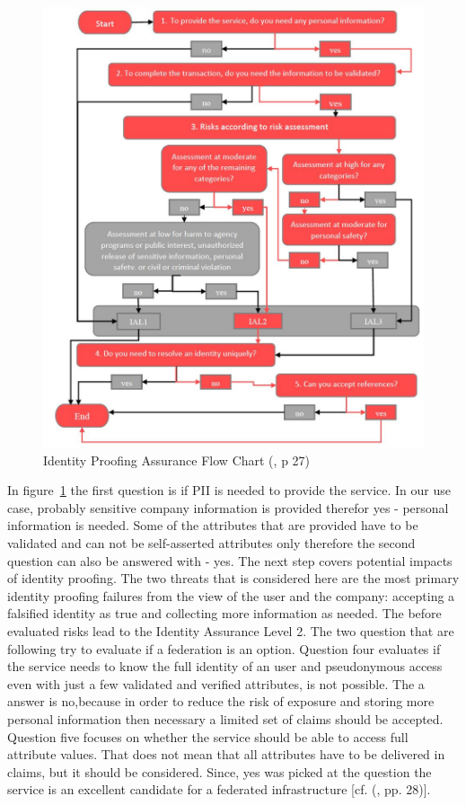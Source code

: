 \begin{figure}[h]
	\centering
	\includegraphics[width=0.9\linewidth]{images/ial_flow_red}
	\caption{Identity Proofing Assurance Flow Chart (\cite{NIST:2017:DIG}, p 27)}
	\label{fig:ialflow}
\end{figure}


In figure~\ref{fig:ialflow} the first question is if PII is needed to provide the service. In our use case, probably sensitive company information is provided therefor yes - personal information is needed. Some of the attributes that are provided have to be validated and can not be self-asserted attributes only therefore the second question can also be answered with - yes.  The next step covers potential impacts of identity proofing. The two threats that is considered here are the most primary identity proofing failures from the view of the user and the company: accepting a falsified identity as true and collecting more information as needed. The before evaluated risks lead to the Identity Assurance Level 2. The two question that are following try to evaluate if a federation is an option. Question four evaluates if the service needs to know the full identity of an user and pseudonymous access even with just a few validated and verified attributes, is not possible. The a answer is no,because in order to reduce the risk of exposure and storing more personal information then necessary a limited set of claims should be accepted. Question five focuses on whether the service should be able to access full attribute values. That does not mean that all attributes have to be delivered in claims, but it should be considered. Since, yes was picked at the question the service is an excellent candidate for a federated infrastructure [cf. (\cite{NIST:2017:DIG}, pp. 28)]. 


